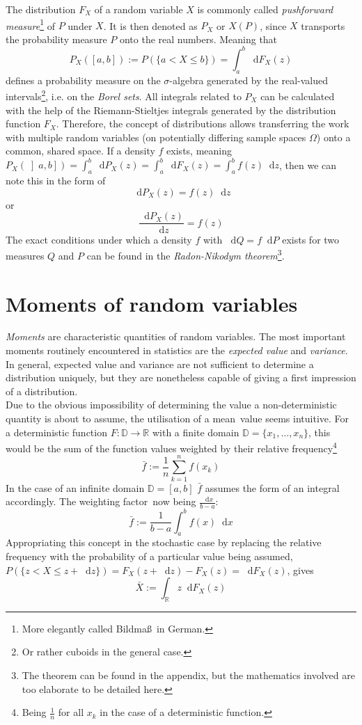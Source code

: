 \documentclass[12pt]{article}
\newcommand*\diff{\mathop{}\!\mathrm{d}}
\begin{document}
The distribution $F_X$ of a random variable $X$ is commonly called \textit{pushforward measure}\footnote{More elegantly called \glqq Bildmaß\grqq \ in German.} of $P$ under $X$. It is then denoted as $P_X$ or $X(P)$, since $X$ \glqq transports \grqq the probability measure $P$ onto the real numbers. Meaning that
\[
P_X(\left[ a, b\right]) := P(\{a < X \leq b\}) = \int_a^b \diff F_X (z)
\]
defines a probability measure on the $\sigma$-algebra generated by the real-valued intervals\footnote{Or rather cuboids in the general case.}, i.e. on the \textit{Borel sets}. All integrals related to $P_X$ can be calculated with the help of the Riemann-Stieltjes integrals generated by the distribution function $F_X$. Therefore, the concept of distributions allows transferring the work with multiple random variables (on potentially differing sample spaces $\Omega$) onto a common, shared space. If a density $f$ exists, meaning $P_X(\left] a, b\right]) = \int_a^b \diff P_X(z)= \int_a^b \diff F_X(z) = \int_a^b f (z)\diff z$, then we can note this in the form of
\[
\diff P_X (z) = f (z) \diff z
\]
or
\[
\frac{\diff P_X(z)}{\diff z} = f (z)
\]
The exact conditions under which a density $f$ with $\diff Q = f \diff P$ exists for two measures $Q$ and $P$ can be found in the \textit{Radon-Nikodym theorem}\footnote{The theorem can be found in the appendix, but the mathematics involved are too elaborate to be detailed here.}.

\section{Moments of random variables}
\textit{Moments} are characteristic quantities of random variables. The most important moments routinely encountered in statistics are the \textit{expected value} and \textit{variance}. In general, expected value and variance are not sufficient to determine a distribution uniquely, but they are nonetheless capable of giving a first impression of a distribution.\\
Due to the obvious impossibility of determining the value a non-deterministic quantity is about to assume, the utilisation of a \glqq mean\grqq \ value seems intuitive.
For a deterministic function $F: \mathbb{D} \to \mathbb{R}$ with a finite domain $\mathbb{D} = \{ x_1, \dots , x_n\}$, this would be the sum of the function values weighted by their relative frequency\footnote{Being $\frac{1}{n}$ for all $x_k$ in the case of a deterministic function.}
\[
\bar{f}:= \frac{1}{n} \sum_{k = 1}^{n}f(x_k)
\]
In the case of an infinite domain $\mathbb{D} = \left[ a, b \right]$ $\bar{f}$ assumes the form of an integral accordingly. The weighting \glqq factor\grqq \ now being $\frac{\diff x}{b - a}$:
\[
\bar{f} := \frac{1}{b - a} \int_a^b f(x) \diff x
\]
Appropriating this concept in the stochastic case by replacing the relative frequency with the probability of a particular value being assumed, $P(\{z < X \leq z + \diff z\}) = F_X(z + \diff z) - F_X (z) = \diff F_X(z)$, gives
\[
\bar{X} := \int_\mathbb{R} z \diff F_X(z)
\]
\end{document}
